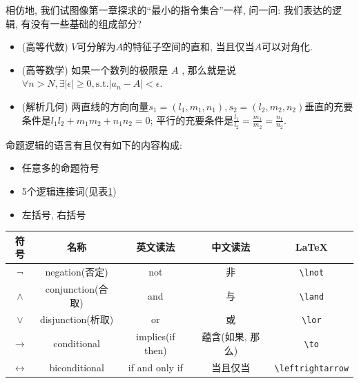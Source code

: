 相仿地, 我们试图像第一章探求的``最小的指令集合''一样, 问一问: 我们表达的逻辑, 有没有一些基础的组成部分? 

\begin{example}
	\begin{itemize}
		\item (高等代数) $V$可分解为$A$的特征子空间的直和, 当且仅当$A$可以对角化. 
		\item (高等数学) 如果一个数列的极限是 $A$ , 那么就是说$\forall n>N, \exists |\epsilon|\geq 0, \text{s.t.} |a_n-A|<\epsilon$.
		\item (解析几何) 两直线的方向向量$s_{1}=(l_{1},m_{1},n_{1}),s_{2}=(l_{2},m_{2},n_{2})$垂直的充要条件是$l_{1}l_{2}+m_{1}m_{2}+n_{1}n_{2}=0$;
平行的充要条件是$\frac{l_{1}}{l_{2}}=\frac{m_{1}}{m_{2}}=\frac{n_{1}}{n_{2}}.$
	\end{itemize}
\end{example}



\begin{definition}[命题逻辑的语法]
        命题逻辑的语言有且仅有如下的内容构成: 
        \begin{itemize}
            \item 任意多的命题符号
            \item 5个逻辑连接词(见表\ref{fig:conn})
            \item 左括号, 右括号
      	\end{itemize}
\end{definition}

\begin{table}
    \centering
    \begin{tabular}{|c||c|c|c|c|}
      \hline
      符号& 名称 & 英文读法 & 中文读法 & \LaTeX \\
      \hline \hline
      $\lnot$ & {negation}{(否定)} & not & 非 & \verb|\lnot| \\
      \hline
      $\land$ & {conjunction}{(合取)} & and & 与 & \verb|\land| \\
      \hline
      $\lor$ & {disjunction}{(析取)} & or & 或 & \verb|\lor| \\
      \hline
      $\to$ & conditional & {implies}{(if then)}
        & {蕴含}{(如果, 那么)} & \verb|\to| \\
      \hline
      $\leftrightarrow$ & biconditional & if and only if
        & 当且仅当 & \verb|\leftrightarrow| \\
      \hline
      \end{tabular}
    \label{fig:conn}
  \end{table}

